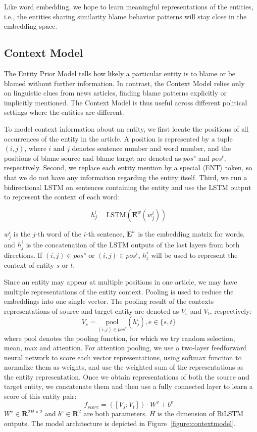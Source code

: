 \documentclass[letterpaper]{article} %
\begin{document}
Like word embedding, we hope to learn meaningful representations of the entities, i.e., the entities sharing similarity blame behavior patterns will stay close in the embedding space.

\subsection{Context Model}
\label{contextmodel}

The Entity Prior Model tells how likely a particular entity is to blame or be blamed without further information. In contrast, the Context Model relies only on linguistic clues from news articles, finding blame patterns explicitly or implicitly mentioned. The Context Model is thus useful across different political settings where the entities are different.

To model context information about an entity, we first locate the positions of all occurrences of the entity in the article. A position is represented by a tuple $(i, j)$, where $i$ and $j$ denotes sentence number and word number, and the positions of blame source and blame target are denoted as $pos^s$ and $pos^t$, respectively. Second, we replace each entity mention by a special $\langle$ENT$\rangle$ token, so that we do not have any information regarding the entity itself. Third, we run a bidirectional LSTM on sentences containing the entity and use the LSTM output to represent the context of each word:

$$h^i_j=\mathrm{LSTM}(\mathbf{E}^w(w^i_j))$$

$w^i_j$ is the $j$-th word of the $i$-th sentence, $\mathbf{E}^w$ is the embedding matrix for words, and $h^i_j$ is the concatenation of the LSTM outputs of the last layers from both directions. If $(i, j) \in pos^s$ or $(i, j) \in pos^t$, $h^i_j$ will be used to represent the context of entity $s$ or $t$.

Since an entity may appear at multiple positions in one article, we may have multiple representations of the entity context. Pooling is used to reduce the embeddings into one single vector. The pooling result of the contexts representations of source and target entity are denoted as $V_s$ and $V_t$, respectively: $$V_e = \underset{(i, j) \in pos^e} {\mathrm{pool}} (h^i_j), e \in \{s, t\}$$where $\mathrm{pool}$ denotes the pooling function, for which we try random selection, mean, max and attention. For attention pooling, we use a two-layer feedforward neural network to score each vector representations, using softmax function to normalize them as weights, and use the weighted sum of the representations as the entity representation. Once we obtain representations of both the source and target entity, we concatenate them and then use a fully connected layer to learn a score of this entity pair: $$f_{score} = ([V_s; V_t]) \cdot W^v + b^v $$ $W^v \in \mathbf{R}^{2H \times 2}$ and $b^v \in \mathbf{R}^{2}$ are both parameters. $H$ is the dimension of BiLSTM outputs. The model architecture is depicted in Figure~\ref{figure:contextmodel}.
\end{document}
